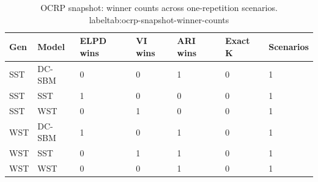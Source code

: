 \begin{table}[!h]
\centering
\caption{OCRP snapshot: winner counts across one-repetition scenarios.\\label{tab:ocrp-snapshot-winner-counts}}
\centering
\begin{tabular}[t]{lllllll}
\toprule
Gen & Model & ELPD wins & VI wins & ARI wins & Exact K & Scenarios\\
\midrule
SST & DC-SBM & 0 & 0 & 1 & 0 & 1\\
SST & SST & 1 & 0 & 0 & 0 & 1\\
SST & WST & 0 & 1 & 0 & 0 & 1\\
WST & DC-SBM & 1 & 0 & 1 & 0 & 1\\
WST & SST & 0 & 1 & 1 & 0 & 1\\
WST & WST & 0 & 0 & 1 & 0 & 1\\
\bottomrule
\end{tabular}
\end{table}
